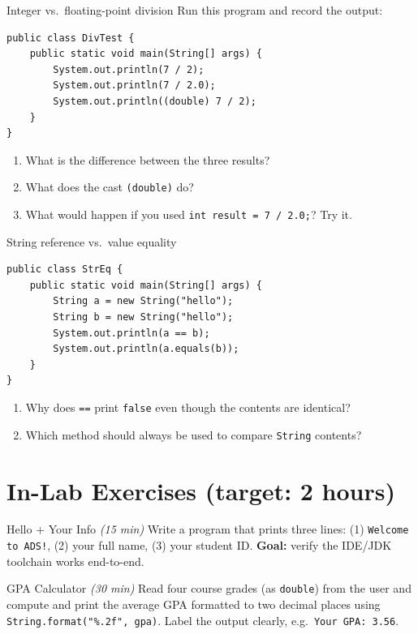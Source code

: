 \documentclass[11pt]{article}
\begin{document}
\begin{tryit}{Integer vs.\ floating-point division}
Run this program and record the output:
\begin{lstlisting}
public class DivTest {
    public static void main(String[] args) {
        System.out.println(7 / 2);
        System.out.println(7 / 2.0);
        System.out.println((double) 7 / 2);
    }
}
\end{lstlisting}
\begin{enumerate}[nosep,leftmargin=*]
  \item What is the difference between the three results?
  \item What does the cast \texttt{(double)} do?
  \item What would happen if you used \texttt{int result = 7 / 2.0;}? Try it.
\end{enumerate}
\end{tryit}

\begin{tryit}{String reference vs.\ value equality}
\begin{lstlisting}
public class StrEq {
    public static void main(String[] args) {
        String a = new String("hello");
        String b = new String("hello");
        System.out.println(a == b);
        System.out.println(a.equals(b));
    }
}
\end{lstlisting}
\begin{enumerate}[nosep,leftmargin=*]
  \item Why does \texttt{==} print \texttt{false} even though the contents are identical?
  \item Which method should always be used to compare \texttt{String} contents?
\end{enumerate}
\end{tryit}

\section*{In-Lab Exercises (target: 2 hours)}

\begin{labexercise}{Hello + Your Info \hfill {\small \itshape (15 min)}}
Write a program that prints three lines: (1) \texttt{Welcome to ADS!},
(2) your full name, (3) your student ID.
\textbf{Goal:} verify the IDE/JDK toolchain works end-to-end.
\end{labexercise}

\begin{labexercise}{GPA Calculator \hfill {\small \itshape (30 min)}}
Read four course grades (as \texttt{double}) from the user and compute and print the
average GPA formatted to two decimal places using \texttt{String.format("\%.2f", gpa)}.
Label the output clearly, e.g.\ \texttt{Your GPA: 3.56}.
\end{labexercise}
\end{document}
